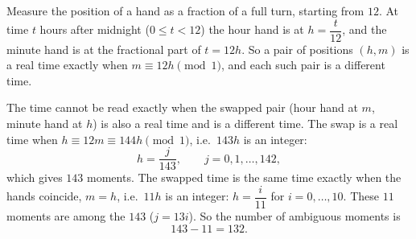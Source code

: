 Measure the position of a hand as a fraction of a full turn, starting from $12$. At time $t$ hours after midnight ($0\le t<12$) the hour hand is at $h=\dfrac{t}{12}$, and the minute hand is at the fractional part of $t=12h$. So a pair of positions $(h,m)$ is a real time exactly when $m\equiv12h\pmod1$, and each such pair is a different time.

The time cannot be read exactly when the swapped pair (hour hand at $m$, minute hand at $h$) is also a real time and is a different time. The swap is a real time when $h\equiv12m\equiv144h\pmod1$, i.e.\ $143h$ is an integer:
\[
h=\dfrac{j}{143},\qquad j=0,1,\dots,142,
\]
which gives $143$ moments. The swapped time is the same time exactly when the hands coincide, $m=h$, i.e.\ $11h$ is an integer: $h=\dfrac{i}{11}$ for $i=0,\dots,10$. These $11$ moments are among the $143$ ($j=13i$). So the number of ambiguous moments is
\[
143-11=\boxed{132}.
\]

